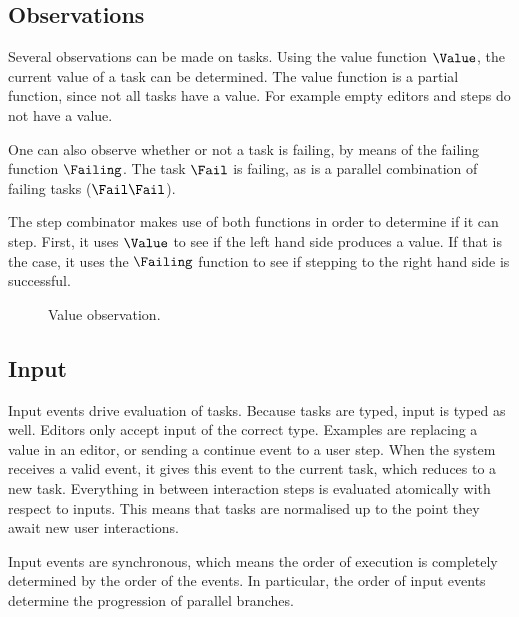 \subsection{Observations}

Several observations can be made on tasks.
Using the value function $\Value$, the current value of a task can be determined.
The value function is a partial function, since not all tasks have a value.
For example empty editors and steps do not have a value.

One can also observe whether or not a task is failing, by means of the failing function $\Failing$.
The task $\Fail$ is failing, as is a parallel combination of failing tasks ($\Fail \And \Fail$).

The step combinator makes use of both functions in order to determine if it can step.
First, it uses $\Value$ to see if the left hand side produces a value.
If that is the case, it uses the $\Failing$ function to see if stepping to the right hand side is successful.

\begin{figure}[h]
  \centering \small
  \caption{
    Value observation.
  } \label{}
\end{figure}


\subsection{Input}

Input events drive evaluation of tasks.
Because tasks are typed, input is typed as well.
Editors only accept input of the correct type.
Examples are replacing a value in an editor,
or sending a continue event to a user step.
When the system receives a valid event, it gives this event to the current task, which reduces to a new task.
Everything in between interaction steps is evaluated atomically with respect to inputs.
This means that tasks are normalised up to the point they await new user interactions.

Input events are synchronous, which means the order of execution is completely determined by the order of the events.
In particular, the order of input events determine the progression of parallel branches.
